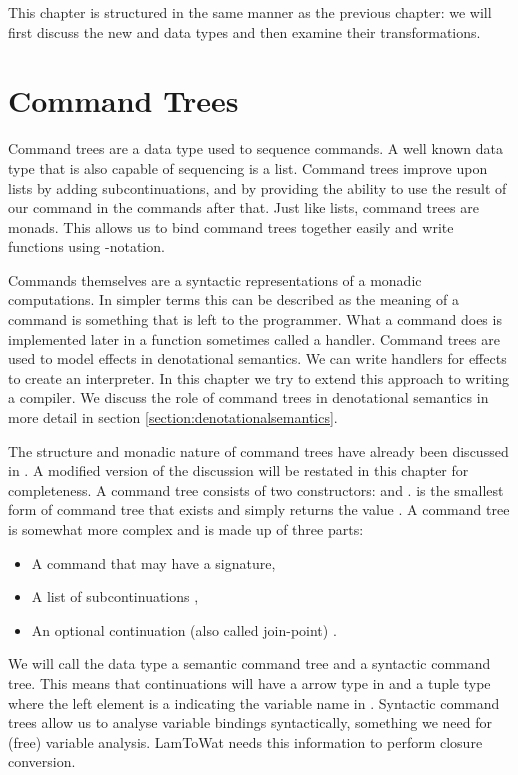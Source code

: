 This chapter is structured in the same manner as the previous chapter: we will first discuss the new  and  data types and then examine their transformations.

\section{\label{section:commandtree}Command Trees}
Command trees are a data type used to sequence commands. A well known data type that is also capable of sequencing is a list. Command trees improve upon lists by adding subcontinuations, and by providing the ability to use the result of our command in the commands after that. Just like lists, command trees are monads. This allows us to bind command trees together easily and write functions using -notation.

Commands themselves are a syntactic representations of a monadic computations. In simpler terms this can be described as the meaning of a command is something that is left to the programmer. What a command does is implemented later in a function sometimes called a handler. Command trees are used to model effects in denotational semantics. We can write handlers for effects to create an interpreter. In this chapter we try to extend this approach to writing a compiler. We discuss the role of command trees in denotational semantics in more detail in section \ref{section:denotationalsemantics}.

The structure and monadic nature of command trees have already been discussed in  \autocite{commandtreespoulsen}. A modified version of the discussion will be restated in this chapter for completeness. A command tree consists of two constructors:  and .  is the smallest form of command tree that exists and simply returns the value . A  command tree is somewhat more complex and is made up of three parts:

\begin{itemize}
\item A command  that may have a signature,
\item A list of subcontinuations ,
\item An optional continuation (also called join-point) .
\end{itemize}

We will call the data type  a semantic command tree and  a syntactic command tree. This means that continuations will have a arrow type  in  and a tuple type where the left element is a  indicating the variable name  in . Syntactic command trees allow us to analyse variable bindings syntactically, something we need for (free) variable analysis. LamToWat needs this information to perform closure conversion.

